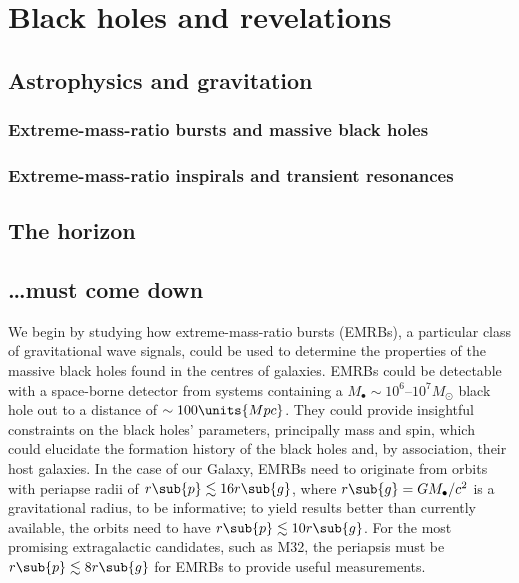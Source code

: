 \chapter{Black holes and revelations}\label{ch:All-good-things}

\section{Astrophysics and gravitation}

\subsection{Extreme-mass-ratio bursts and massive black holes}


\subsection{Extreme-mass-ratio inspirals and transient resonances}

\section{The horizon}

\section{\ldots must come down}

We begin by studying how extreme-mass-ratio bursts (EMRBs), a particular class of gravitational wave signals, could be used to determine the properties of the massive black holes found in the centres of galaxies. EMRBs could be detectable with a space-borne detector from systems containing a $M_\bullet \sim 10^6$--$10^7 M_\odot$ black hole out to a distance of $\sim 100\units{Mpc}$. They could provide insightful constraints on the black holes' parameters, principally mass and spin, which could elucidate the formation history of the black holes and, by association, their host galaxies. In the case of our Galaxy, EMRBs need to originate from orbits with periapse radii of $r\sub{p} \lesssim 16 r\sub{g}$, where $r\sub{g} = GM_\bullet/c^2$ is a gravitational radius, to be informative; to yield results better than currently available, the orbits need to have $r\sub{p} \lesssim 10 r\sub{g}$. For the most promising extragalactic candidates, such as M32, the periapsis must be $r\sub{p} \lesssim 8 r\sub{g}$ for EMRBs to provide useful measurements.




